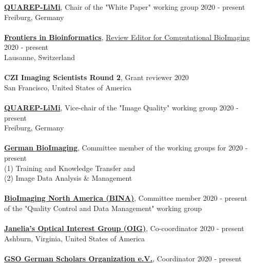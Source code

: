 \documentclass[margin,line]{res}
\begin{document}
\begin{resume}
{\bf \href{https://quarep.org/}{QUAREP-LiMi}}, Chair of the "White Paper" working group \hfill {2020 - present}\\
Freiburg, Germany\\
\vspace*{-3mm}\\
{\bf  \href{https://www.frontiersin.org/journals/bioinformatics/sections/computational-bioimaging}{ Frontiers in Bioinformatics}},  \href{https://www.frontiersin.org/journals/bioinformatics/sections/computational-bioimaging}{Review Editor for Computational BioImaging} \hfill {2020 - present}\\
Lausanne, Switzerland\\
\vspace*{-3mm}\\
{\bf CZI Imaging Scientists Round 2}, Grant reviewer \hfill {2020}\\
San Francisco, United States of America\\
\vspace*{-3mm}\\
{\bf \href{https://quarep.org/}{QUAREP-LiMi}}, Vice-chair of the "Image Quality" working group  \hfill {2020 - present}\\
Freiburg, Germany\\
\vspace*{-3mm}\\
{\bf \href{https://www.gerbi-gmb.de/}{German BioImaging}}, Committee member of the working groups for \hfill {2020 - present}\\
 (1)  Training and Knowledge Transfer and\\
(2) Image Data Analysis \& Management\\
\vspace*{-3mm}\\
{\bf \href{https://www.bioimagingna.org/}{BioImaging North America (BINA)}}, Committee member \hfill {2020 - present}\\
of the "Quality Control and Data Management" working group\\
\vspace*{-3mm}\\
{\bf \href{https://www.janelia.org/content/optical-interest-group}{Janelia's Optical Interest Group (OIG)}}, Co-coordinator \hfill {2020 - present}\\
Ashburn, Virginia, United States of America\\
\vspace*{-3mm}\\
{\bf \href{https://www.gain-network.org/en/about-gain/gain-chapters/}{GSO German Scholars Organization e.V.}}, Coordinator  \hfill {2020 - present}\\

\end{resume}
\end{document}
